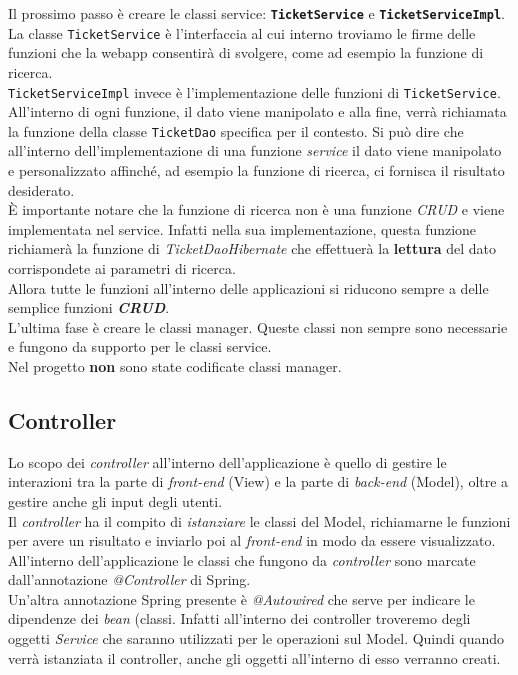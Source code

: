 \noindent
Il prossimo passo è creare le classi service: \texttt{\textbf{TicketService}} e \texttt{\textbf{TicketServiceImpl}}.\\
La classe \texttt{TicketService} è l'interfaccia al cui interno troviamo le firme delle funzioni che la webapp consentirà di svolgere, come ad esempio la funzione di ricerca. \\
\texttt{TicketServiceImpl} invece è l'implementazione delle funzioni di \texttt{TicketService}. All'interno di ogni funzione, il dato viene manipolato e alla fine, verrà richiamata la funzione della classe \texttt{TicketDao} specifica per il contesto. 
Si può dire che all'interno dell'implementazione di una funzione \textit{service} il dato viene manipolato e personalizzato affinché, ad esempio la funzione di ricerca, ci fornisca il risultato desiderato.\\

\noindent
È importante notare che la funzione di ricerca non è una funzione \textit{CRUD} e viene implementata nel service. Infatti nella sua implementazione, questa funzione richiamerà la funzione di \textit{TicketDaoHibernate} che effettuerà la \textbf{lettura} del dato corrispondete ai parametri di ricerca.\\

\noindent
Allora tutte le funzioni all'interno delle applicazioni si riducono sempre a delle semplice funzioni \textit{\textbf{CRUD}}.\\

\noindent
L'ultima fase è creare le classi manager. Queste classi non sempre sono necessarie e fungono da supporto per le classi service. \\
Nel progetto \textbf{non} sono state codificate classi manager.

\subsection*{Controller}
Lo scopo dei \textit{controller} all'interno dell'applicazione è quello di gestire le interazioni tra la parte di \textit{front-end} (View) e la parte di \textit{back-end} (Model), oltre a gestire anche gli input degli utenti.\\

\noindent
Il \textit{controller} ha il compito di \textit{istanziare} le classi del Model, richiamarne le funzioni per avere un risultato e inviarlo poi al \textit{front-end} in modo da essere visualizzato.
All'interno dell'applicazione le classi che fungono da \textit{controller} sono marcate dall'annotazione \textit{@Controller} di Spring.\\
Un'altra annotazione Spring presente è \textit{@Autowired} che serve per indicare le dipendenze dei \textit{bean} (classi. Infatti all'interno dei controller troveremo degli oggetti \textit{Service} che saranno utilizzati per le operazioni sul Model. Quindi quando verrà istanziata il controller, anche gli oggetti all'interno di esso verranno creati.\\


